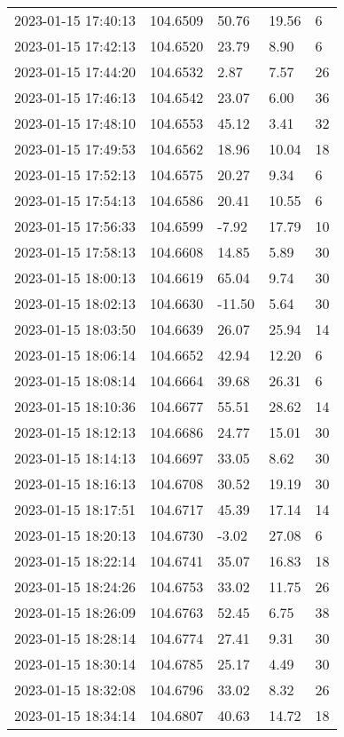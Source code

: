 \documentclass{nature_plusfigure}
\begin{document}
\begin{supplement}
\begin{center}
\begin{longtable}{lllll}
2023-01-15 17:40:13 & 104.6509 & 50.76 & 19.56 & 6 \\ 
2023-01-15 17:42:13 & 104.6520 & 23.79 & 8.90 & 6 \\ 
2023-01-15 17:44:20 & 104.6532 & 2.87 & 7.57 & 26 \\ 
2023-01-15 17:46:13 & 104.6542 & 23.07 & 6.00 & 36 \\ 
2023-01-15 17:48:10 & 104.6553 & 45.12 & 3.41 & 32 \\ 
2023-01-15 17:49:53 & 104.6562 & 18.96 & 10.04 & 18 \\ 
2023-01-15 17:52:13 & 104.6575 & 20.27 & 9.34 & 6 \\ 
2023-01-15 17:54:13 & 104.6586 & 20.41 & 10.55 & 6 \\ 
2023-01-15 17:56:33 & 104.6599 & -7.92 & 17.79 & 10 \\ 
2023-01-15 17:58:13 & 104.6608 & 14.85 & 5.89 & 30 \\ 
2023-01-15 18:00:13 & 104.6619 & 65.04 & 9.74 & 30 \\ 
2023-01-15 18:02:13 & 104.6630 & -11.50 & 5.64 & 30 \\ 
2023-01-15 18:03:50 & 104.6639 & 26.07 & 25.94 & 14 \\ 
2023-01-15 18:06:14 & 104.6652 & 42.94 & 12.20 & 6 \\ 
2023-01-15 18:08:14 & 104.6664 & 39.68 & 26.31 & 6 \\ 
2023-01-15 18:10:36 & 104.6677 & 55.51 & 28.62 & 14 \\ 
2023-01-15 18:12:13 & 104.6686 & 24.77 & 15.01 & 30 \\ 
2023-01-15 18:14:13 & 104.6697 & 33.05 & 8.62 & 30 \\ 
2023-01-15 18:16:13 & 104.6708 & 30.52 & 19.19 & 30 \\ 
2023-01-15 18:17:51 & 104.6717 & 45.39 & 17.14 & 14 \\ 
2023-01-15 18:20:13 & 104.6730 & -3.02 & 27.08 & 6 \\ 
2023-01-15 18:22:14 & 104.6741 & 35.07 & 16.83 & 18 \\ 
2023-01-15 18:24:26 & 104.6753 & 33.02 & 11.75 & 26 \\ 
2023-01-15 18:26:09 & 104.6763 & 52.45 & 6.75 & 38 \\ 
2023-01-15 18:28:14 & 104.6774 & 27.41 & 9.31 & 30 \\ 
2023-01-15 18:30:14 & 104.6785 & 25.17 & 4.49 & 30 \\ 
2023-01-15 18:32:08 & 104.6796 & 33.02 & 8.32 & 26 \\ 
2023-01-15 18:34:14 & 104.6807 & 40.63 & 14.72 & 18 \\ 

\end{longtable}
\end{center}
\end{supplement}
\end{document}

